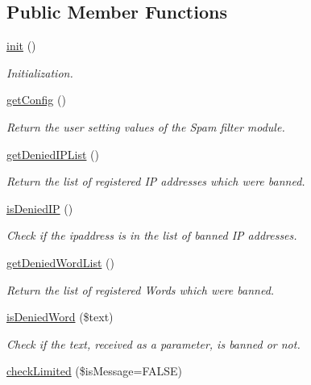 \subsection*{Public Member Functions}
\begin{DoxyCompactItemize}
\item 
\hyperlink{classspamfilterModel_ab4bc83fb75d4c469e674e46ae0e22b52}{init} ()
\begin{DoxyCompactList}\small\item\em Initialization. \end{DoxyCompactList}\item 
\hyperlink{classspamfilterModel_a695fa33af1081275d523cb9366645e85}{get\+Config} ()
\begin{DoxyCompactList}\small\item\em Return the user setting values of the Spam filter module. \end{DoxyCompactList}\item 
\hyperlink{classspamfilterModel_a117cc4509f6046a16e90f8a03e55ed3a}{get\+Denied\+I\+P\+List} ()
\begin{DoxyCompactList}\small\item\em Return the list of registered IP addresses which were banned. \end{DoxyCompactList}\item 
\hyperlink{classspamfilterModel_a4f657cf632890244b2664acff0ee8706}{is\+Denied\+IP} ()
\begin{DoxyCompactList}\small\item\em Check if the ipaddress is in the list of banned IP addresses. \end{DoxyCompactList}\item 
\hyperlink{classspamfilterModel_a9fba3707067716e5668f6de7bf54f8f7}{get\+Denied\+Word\+List} ()
\begin{DoxyCompactList}\small\item\em Return the list of registered Words which were banned. \end{DoxyCompactList}\item 
\hyperlink{classspamfilterModel_a5661bac60c32b451cbda5f7a9587b13e}{is\+Denied\+Word} (\$text)
\begin{DoxyCompactList}\small\item\em Check if the text, received as a parameter, is banned or not. \end{DoxyCompactList}\item 
\hyperlink{classspamfilterModel_af681d9fd66de2c4769ebe3880983c689}{check\+Limited} (\$is\+Message=F\+A\+L\+SE)

\end{DoxyCompactItemize}

